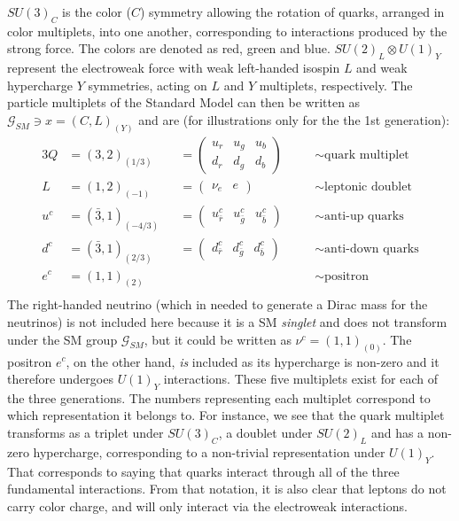 $SU(3)_C$ is the color ($C$) symmetry allowing the rotation of quarks, arranged in color multiplets, into one another, corresponding to interactions produced by the strong force. The colors are denoted as red, green and blue. $SU (2)_L \otimes U(1)_Y$ represent the electroweak force with weak left-handed isospin $L$ and weak hypercharge $Y$ symmetries, acting on $L$ and $Y$ multiplets, respectively. %
The particle multiplets of the Standard Model can then be written as $\mathcal{G}_{SM} \ni x=(C,L)_{(Y)}$ and are (for illustrations only for the the 1st generation):
\begin{alignat}{3}
  \label{eq:theory:multiplets}
Q &= (3,2)_{(1/3)} &&=
  \begin{pmatrix} 
    u_r & u_g & u_b \\
    d_r & d_g & d_b
    \end{pmatrix} \quad  &&\sim \textrm{quark multiplet} \\[1pt]
L &= (1,2)_{(-1)} &&= \begin{pmatrix} \nu_e & e \end{pmatrix} \quad &&\sim \textrm{leptonic doublet} \\[1pt]
u^c &= (\bar{3},1)_{(-4/3)} &&= \begin{pmatrix} u_{\bar{r}}^c & u_{\bar{g}}^c & u_{\bar{b}}^c\end{pmatrix} \quad &&\sim \textrm{anti-up quarks} \\[1pt]
d^c &= (\bar{3},1)_{(2/3)}  &&= \begin{pmatrix} d_{\bar{r}}^c & d_{\bar{g}}^c & d_{\bar{b}}^c\end{pmatrix} \quad &&\sim \textrm{anti-down quarks} \\[1pt]
e^c &= (1,1)_{(2)}          && \quad &&\sim \textrm{positron} \\
\end{alignat}
The right-handed neutrino (which in needed to generate a Dirac mass for the neutrinos) is not included here because it is a SM \emph{singlet} and does not transform under the SM group $\mathcal{G}_{SM}$, but it could be written as $\nu^c=(1,1)_{(0)}$. The positron $e^c$, on the other hand, \emph{is} included as its hypercharge is non-zero and it therefore undergoes $U(1)_Y$ interactions. These five multiplets exist for each of the three generations.\newline
The numbers representing each multiplet correspond to which representation it belongs to. For instance, we see that the quark multiplet transforms as a triplet under $SU(3)_C$, a doublet under $SU(2)_L$ and has a non-zero hypercharge, corresponding to a non-trivial representation under $U(1)_Y$. That corresponds to saying that quarks interact through all of the three fundamental interactions. From that notation, it is also clear that leptons do not carry color charge, and will only interact via the electroweak interactions.\newline
